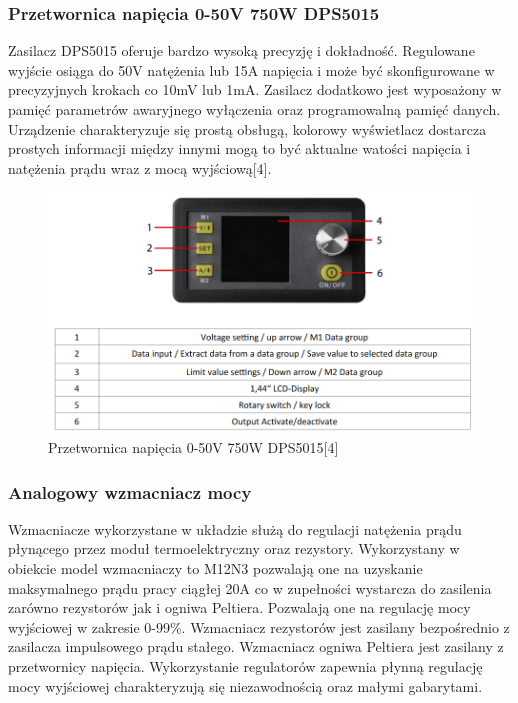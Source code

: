 \documentclass[oneside]{mgr}
\begin{document}
\subsubsection{Przetwornica napięcia 0-50V 750W DPS5015}

Zasilacz DPS5015 oferuje bardzo wysoką precyzję i dokładność. Regulowane wyjście osiąga do 50V natężenia lub 15A napięcia i może być skonfigurowane w precyzyjnych krokach co 10mV lub 1mA. Zasilacz dodatkowo jest wyposażony w pamięć parametrów awaryjnego wyłączenia oraz programowalną pamięć danych. Urządzenie charakteryzuje się prostą obsługą, kolorowy wyświetlacz dostarcza prostych informacji między innymi mogą to być aktualne watości napięcia i natężenia prądu wraz z mocą wyjściową[4].

\begin{figure}
    \centering
    \includegraphics[width=\textwidth]{Przetwornica_napiecia.PNG}
    \caption{Przetwornica napięcia 0-50V 750W DPS5015[4]}
\end{figure}

\subsubsection{Analogowy wzmacniacz mocy}
Wzmacniacze wykorzystane w układzie służą do regulacji natężenia prądu płynącego przez moduł termoelektryczny oraz rezystory. Wykorzystany w obiekcie model wzmacniaczy to M12N3 pozwalają one na uzyskanie maksymalnego prądu pracy ciągłej 20A co w zupełności wystarcza do zasilenia zarówno rezystorów jak i ogniwa Peltiera. Pozwalają one na regulację mocy wyjściowej w zakresie 0-99\%. Wzmacniacz rezystorów jest zasilany bezpośrednio z zasilacza impulsowego prądu stałego. Wzmacniacz ogniwa Peltiera jest zasilany z przetwornicy napięcia. Wykorzystanie regulatorów zapewnia płynną regulację mocy wyjściowej charakteryzują się niezawodnością oraz małymi gabarytami. 
\end{document}
